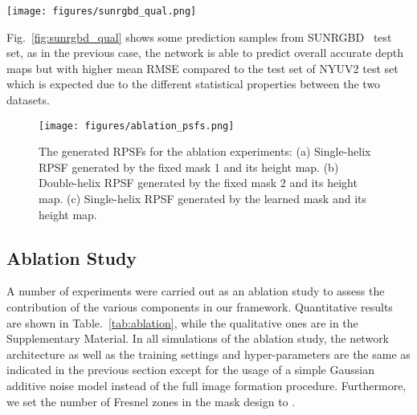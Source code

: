 \documentclass[preprint,5p,twocolumn]{elsarticle}
\begin{document}
\begin{figure*}[h!]
\centering
\texttt{[image: figures/sunrgbd\_qual.png]}
\caption{Qualitative results from our proposed method on the test set SUNRGBD~\cite{song2015sun}}
\label{fig:sunrgbd_qual}
\end{figure*}
Fig.~\ref{fig:sunrgbd_qual} shows some prediction samples from SUNRGBD~\cite{song2015sun} test set, as in the previous case, the network is able to predict overall accurate depth maps but with higher mean RMSE compared to the test set of NYUV2 test set~\cite{eigen2015predicting} which is expected due 
to the different statistical properties between the two datasets.








\begin{figure}[h!]
\centering
\texttt{[image: figures/ablation\_psfs.png]}

\caption{The generated RPSFs for the ablation experiments: (a) Single-helix RPSF generated by the fixed mask 1 and its height map. (b) Double-helix RPSF generated by the fixed mask 2 and its height map. (c) Single-helix RPSF generated by the learned mask and its height map.}
\label{fig:ablation_psfs}
\end{figure}

\subsection{Ablation Study}
\label{sub_sec:ablation}


A number of experiments were carried out as an ablation study to assess the contribution of the various components in our framework.  Quantitative results are shown in Table.~\ref{tab:ablation}, while  the qualitative ones are in the Supplementary Material. In all simulations of the ablation study, the network architecture as well as the training settings and hyper-parameters are the same as indicated in the previous section except for the usage of
a simple Gaussian additive noise model  instead of the full  image formation procedure. Furthermore, we set the number of Fresnel zones in the mask design  to .


\begin{table}[h!]
\begin{center}
\end{center}
\caption{Quantitative results of the ablation experiments on the test set of FlyingThings3D~\cite{MIFDB16}.}
\label{tab:ablation}
\end{table}
\end{document}
